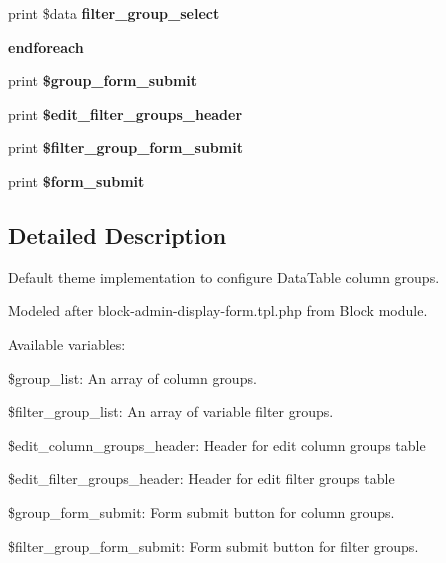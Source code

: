 \begin{DoxyCompactItemize}
print \$data {\bfseries filter\+\_\+group\+\_\+select}
\item 
\mbox{\label{dirt-datatable-admin-search-table-group-settings-form_8tpl_8php_a672d9707ef91db026c210f98cc601123}} 
{\bfseries endforeach}
\item 
\mbox{\label{dirt-datatable-admin-search-table-group-settings-form_8tpl_8php_a2fd5621e5e8e39deaa5aa2e693654ab7}} 
print {\bfseries \$group\+\_\+form\+\_\+submit}
\item 
\mbox{\label{dirt-datatable-admin-search-table-group-settings-form_8tpl_8php_a6f454b4e06999839d9e889a84305dc63}} 
print {\bfseries \$edit\+\_\+filter\+\_\+groups\+\_\+header}
\item 
\mbox{\label{dirt-datatable-admin-search-table-group-settings-form_8tpl_8php_ab85612d677b6a0c43e5212dad43d1acc}} 
print {\bfseries \$filter\+\_\+group\+\_\+form\+\_\+submit}
\item 
\mbox{\label{dirt-datatable-admin-search-table-group-settings-form_8tpl_8php_a781a0b4540f3c04b33978b845353b2ab}} 
print {\bfseries \$form\+\_\+submit}
\end{DoxyCompactItemize}


\subsection{Detailed Description}
Default theme implementation to configure Data\+Table column groups.

Modeled after block-\/admin-\/display-\/form.\+tpl.\+php from Block module.

Available variables\+:
\begin{DoxyItemize}
\item \$group\+\_\+list\+: An array of column groups.
\item \$filter\+\_\+group\+\_\+list\+: An array of variable filter groups.
\item \$edit\+\_\+column\+\_\+groups\+\_\+header\+: Header for edit column groups table
\item \$edit\+\_\+filter\+\_\+groups\+\_\+header\+: Header for edit filter groups table
\item \$group\+\_\+form\+\_\+submit\+: Form submit button for column groups.
\item \$filter\+\_\+group\+\_\+form\+\_\+submit\+: Form submit button for filter groups.
\end{DoxyItemize}

